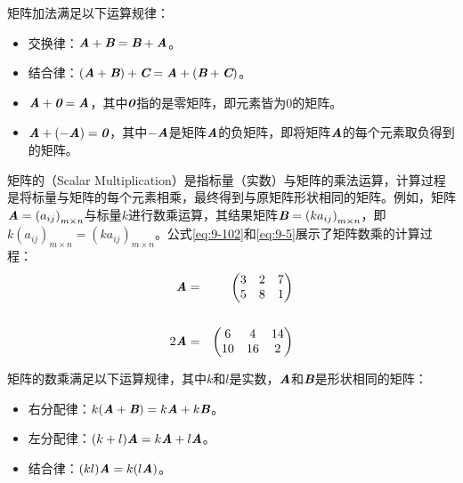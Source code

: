 \parinterval 矩阵加法满足以下运算规律：

\begin{itemize}
\vspace{0.5em}
\item 交换律：$ {\textbf{\em A}}+{\textbf{\em B}} = {\textbf{\em B}} +{\textbf{\em A}} $。
\vspace{0.5em}
\item 结合律：$ ({\textbf{\em A}}+{\textbf{\em B}})+{\textbf{\em C}}= {\textbf{\em A}}+({\textbf{\em B}}+{\textbf{\em C}}) $。
\vspace{0.5em}
\item $ {\textbf{\em A}}+{\textbf{\em 0}}={\textbf{\em A}} $，其中$ {\textbf{\em 0}} $指的是零矩阵，即元素皆为0的矩阵。
\vspace{0.5em}
\item $ {\textbf{\em A}}+(-{\textbf{\em A}})={\textbf{\em 0}} $，其中$ -{\textbf{\em A}} $是矩阵$ {\textbf{\em A}} $的负矩阵，即将矩阵$ {\textbf{\em A}} $的每个元素取负得到的矩阵。
\vspace{0.5em}
\end{itemize}

\parinterval 矩阵的{\small{}}（Scalar Multiplication）是指标量（实数）与矩阵的乘法运算，计算过程是将标量与矩阵的每个元素相乘，最终得到与原矩阵形状相同的矩阵。例如，矩阵$ {\textbf{\em A}}={(a_{ij})}_{m\times n} $与标量$ k $进行数乘运算，其结果矩阵$ {\textbf{\em B}}={(ka_{ij})}_{m\times n} $，即$ k{(a_{ij})}_{m\times n}={(ka_{ij})}_{m\times n} $。公式\eqref{eq:9-102}和\eqref{eq:9-5}展示了矩阵数乘的计算过程：
\begin{eqnarray}
{\textbf{\em A}} & = &
\begin{pmatrix}
   3 & 2 & 7\\
   5 & 8 & 1
\end{pmatrix}
\label{eq:9-102}
\\ \nonumber \\
2{\textbf{\em A}} & = &
\begin{pmatrix}
   6 & 4 & 14\\
   10 & 16 & 2
\end{pmatrix}
\label{eq:9-5}
\end{eqnarray}

\parinterval 矩阵的数乘满足以下运算规律，其中$ k $和$ l $是实数，$ {\textbf{\em A}} $和$ {\textbf{\em B}} $是形状相同的矩阵：

\begin{itemize}
\vspace{0.5em}
\item 右分配律：$ k({\textbf{\em A}}+{\textbf{\em B}})=k{\textbf{\em A}}+k{\textbf{\em B}} $。
\vspace{0.5em}
\item 左分配律：$ (k+l){\textbf{\em A}}=k{\textbf{\em A}}+l{\textbf{\em A}}$。
\vspace{0.5em}
\item 结合律：$ (kl){\textbf{\em A}}=k(l{\textbf{\em A}}) $。
\end{itemize}

